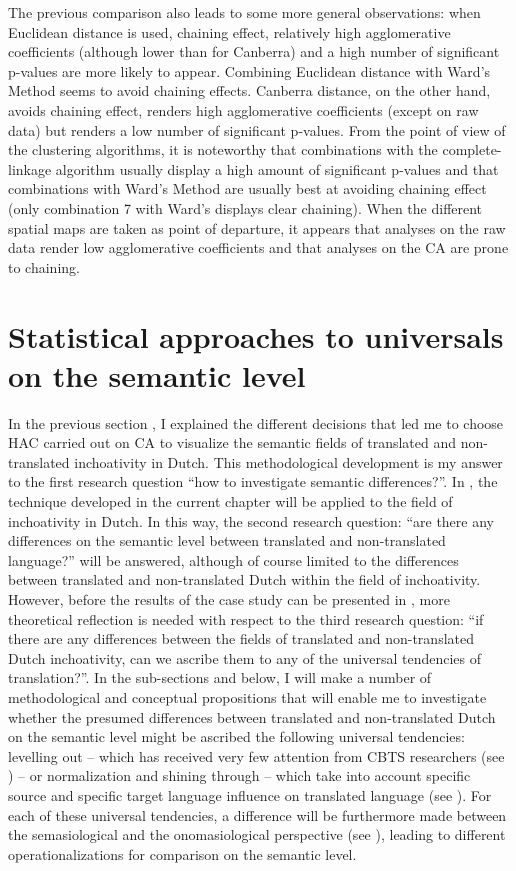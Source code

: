The previous comparison also leads to some more general observations: when Euclidean distance is used, chaining effect, relatively high agglomerative coefficients (although lower than for Canberra) and a high number of significant p-values are more likely to appear. Combining Euclidean distance with Ward’s Method seems to avoid chaining effects. Canberra distance, on the other hand, avoids chaining effect, renders high agglomerative coefficients (except on raw data) but renders a low number of significant p-values. From the point of view of the clustering algorithms, it is noteworthy that combinations with the complete-linkage algorithm usually display a high amount of significant p-values and that combinations with Ward’s Method are usually best at avoiding chaining effect (only combination 7 with Ward’s displays clear chaining). When the different spatial maps are taken as point of departure, it appears that analyses on the raw data render low agglomerative coefficients and that analyses on the CA are prone to chaining.


\section{Statistical approaches to universals on the semantic level}
\label{sec:3.8}
In the previous section , I explained the different decisions that led me to choose HAC carried out on CA to visualize the semantic fields of translated and non-translated inchoativity in Dutch. This methodological development is my answer to the first research question “how to investigate semantic differences?”. In , the technique developed in the current chapter will be applied to the field of inchoativity in Dutch. In this way, the second research question: “are there any differences on the semantic level between translated and non-translated language?” will be answered, although of course limited to the differences between translated and non-translated Dutch within the field of inchoativity. However, before the results of the case study can be presented in , more theoretical reflection is needed with respect to the third research question: “if there are any differences between the fields of translated and non-translated Dutch inchoativity, can we ascribe them to any of the universal tendencies of translation?”. In the sub-sections  and  below, I will make a number of methodological and conceptual propositions that will enable me to investigate whether the presumed differences between translated and non-translated Dutch on the semantic level might be ascribed the following universal tendencies: levelling out – which has received very few attention from CBTS researchers (see ) – or normalization and shining through – which take into account specific source and specific target language influence on translated language (see ). For each of these universal tendencies, a difference will be furthermore made between the semasiological and the onomasiological perspective (see ), leading to different operationalizations for comparison on the semantic level.


